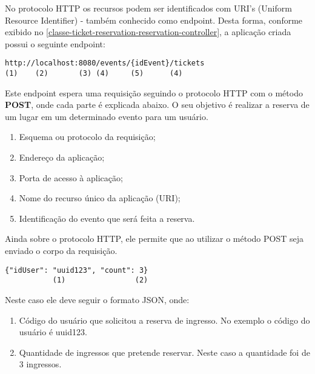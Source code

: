 No protocolo HTTP os recursos podem ser identificados com
URI's (Uniform Resource Identifier) - também conhecido como endpoint.
Desta forma, conforme exibido no \autoref{classe-ticket-reservation-reservation-controller},
a aplicação criada possui o seguinte endpoint:

\begin{minipage}{\linewidth}
\begin{lstlisting}[basicstyle=\ttfamily]
http://localhost:8080/events/{idEvent}/tickets
(1)    (2)       (3) (4)     (5)      (4)
\end{lstlisting}
\end{minipage}

Este endpoint espera uma requisição seguindo o protocolo HTTP
com o método \textbf{POST}, onde cada parte é explicada abaixo. O seu objetivo é
realizar a reserva de um lugar em um determinado evento para um usuário.

\begin{enumerate}

  \item Esquema ou protocolo da requisição;

  \item Endereço da aplicação;

  \item Porta de acesso à aplicação;

  \item Nome do recurso único da aplicação (URI);

  \item Identificação do evento que será feita a reserva.

\end{enumerate}

Ainda sobre o protocolo HTTP,
ele permite que ao utilizar o método POST seja enviado
o corpo da requisição.

\begin{minipage}{\linewidth}
\begin{lstlisting}[basicstyle=\ttfamily]
{"idUser": "uuid123", "count": 3}
           (1)                (2)
\end{lstlisting}
\end{minipage}

Neste caso ele deve seguir o formato JSON, onde:

\begin{enumerate}

  \item Código do usuário que solicitou a reserva de ingresso.
        No exemplo o código do usuário é uuid123.

  \item Quantidade de ingressos que pretende reservar.
        Neste caso a quantidade foi de 3 ingressos.

\end{enumerate}

